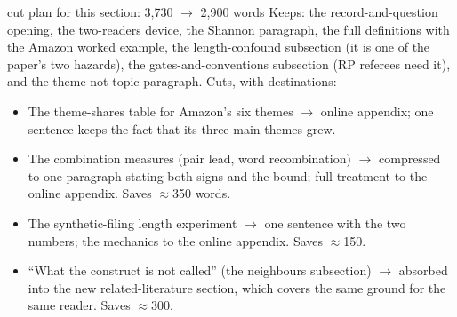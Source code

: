 \begin{ericbox}{cut plan for this section: 3,730 $\to$ 2,900 words}
Keeps: the record-and-question opening, the two-readers device, the
Shannon paragraph, the full definitions with the Amazon worked example,
the length-confound subsection (it is one of the paper's two hazards),
the gates-and-conventions subsection (RP referees need it), and the
theme-not-topic paragraph. Cuts, with destinations:
\begin{itemize}[nosep]
\item The theme-shares table for Amazon's six themes $\to$ online
appendix; one sentence keeps the fact that its three main themes grew.
\item The combination measures (pair lead, word recombination) $\to$
compressed to one paragraph stating both signs and the bound; full
treatment to the online appendix. Saves $\approx$350 words.
\item The synthetic-filing length experiment $\to$ one sentence with the
two numbers; the mechanics to the online appendix. Saves $\approx$150.
\item ``What the construct is not called'' (the neighbours subsection)
$\to$ absorbed into the new related-literature section, which covers the
same ground for the same reader. Saves $\approx$300.
\end{itemize}
\end{ericbox}
